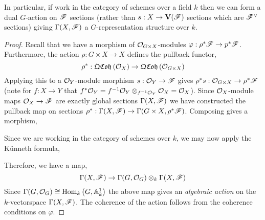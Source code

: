 \documentclass[12pt]{article}
\begin{document}
\begin{proposition}
In particular, if work in the category of schemes over a field $k$ then we can form a dual $G$-action on $\mathscr{F}$ sections (rather than $s : X \to \mathbf{V}(\mathscr{F})$ sections which are $\mathscr{F}^\vee$ sections) giving $\Gamma(X, \mathscr{F})$ a $G$-representation structure over $k$. 
\end{proposition}

\begin{proof}
Recall that we have a morphism of $\mathcal{O}_{G \times X}$-modules $\varphi : \rho^* \mathscr{F} \to p^* \mathscr{F}$. Furthermore, the action $\rho : G \times X \to X$ defines the pullback functor,
\[ \rho^* : \mathfrak{QCoh}\left(\mathcal{O}_{X}\right) \to \mathfrak{QCoh}\left(\mathcal{O}_{G \times X}\right) \]
Applying this to a $\mathcal{O}_{Y}$-module morphism $s : \mathcal{O}_{Y} \to \mathscr{F}$ gives $\rho^* s : \mathcal{O}_{G \times X} \to \rho^* \mathscr{F}$ (note for $f : X \to Y$ that $f^* \mathcal{O}_{Y} = f^{-1} \mathcal{O}_{Y} \otimes_{f^{-1} \mathcal{O}_{Y}} \mathcal{O}_{X} = \mathcal{O}_{X}$). Since $\mathcal{O}_{X}$-module maps $\mathcal{O}_{X} \to \mathscr{F}$ are exactly global sections $\Gamma(X, \mathscr{F})$ we have constructed the pullback map on sections $\rho^* :  \Gamma(X, \mathscr{F}) \to \Gamma(G \times X, \rho^* \mathscr{F})$. Composing gives a morphism,
\begin{center}
\end{center}
Since we are working in the category of schemes over $k$, we may now apply the K\"{u}nneth formula,
\begin{center}
\end{center}
Therefore, we have a map,
\[ \Gamma(X, \mathscr{F}) \to \Gamma(G, \mathcal{O}_{G}) \otimes_k \Gamma(X, \mathscr{F}) \]
Since $\Gamma(G, \mathcal{O}_{G}) \cong \mathrm{Hom}_{k} \left( G, \mathbb{A}^1_k \right)$ the above map gives an \textit{algebraic action} on the $k$-vectorspace $\Gamma(X, \mathscr{F})$. 
The coherence of the action follows from the coherence conditions on $\varphi$. 
\end{proof}
\end{document}
